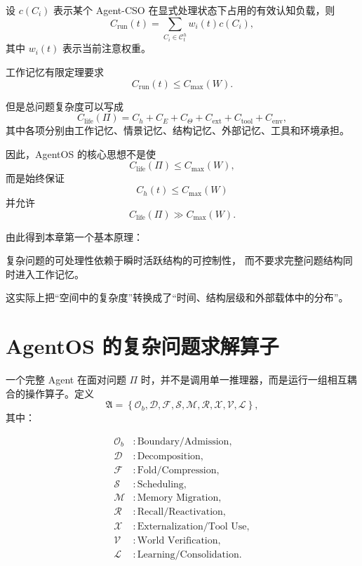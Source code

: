 设 $c(C_i)$ 表示某个 Agent-CSO 在显式处理状态下占用的有效认知负载，则
\begin{equation}
C_{\mathrm{run}}(t)
=
\sum_{C_i\in\mathcal C_t^{h}}
w_i(t)c(C_i),
\end{equation}
其中 $w_i(t)$ 表示当前注意权重。

工作记忆有限定理要求
\begin{equation}
C_{\mathrm{run}}(t)
\leq
C_{\max}(W).
\end{equation}

但是总问题复杂度可以写成
\begin{equation}
C_{\mathrm{life}}(\Pi)
=
C_h
+
C_E
+
C_\Theta
+
C_{\mathrm{ext}}
+
C_{\mathrm{tool}}
+
C_{\mathrm{env}},
\end{equation}
其中各项分别由工作记忆、情景记忆、结构记忆、外部记忆、工具和环境承担。

因此，AgentOS 的核心思想不是使
\begin{equation}
C_{\mathrm{life}}(\Pi)
\leq
C_{\max}(W),
\end{equation}
而是始终保证
\begin{equation}
\boxed{
C_h(t)
\leq
C_{\max}(W)
}
\end{equation}
并允许
\begin{equation}
C_{\mathrm{life}}(\Pi)
\gg
C_{\max}(W).
\end{equation}

由此得到本章第一个基本原理：

\begin{statementbox}
复杂问题的可处理性依赖于瞬时活跃结构的可控制性，
而不要求完整问题结构同时进入工作记忆。
\end{statementbox}

这实际上把“空间中的复杂度”转换成了“时间、结构层级和外部载体中的分布”。

\section{AgentOS 的复杂问题求解算子}

一个完整 Agent 在面对问题 $\Pi$ 时，并不是调用单一推理器，而是运行一组相互耦合的操作算子。定义
\begin{equation}
\mathfrak A
=
\left\{
\mathcal O_b,
\mathcal D,
\mathcal F,
\mathcal S,
\mathcal M,
\mathcal R,
\mathcal X,
\mathcal V,
\mathcal L
\right\},
\end{equation}
其中：

\begin{align}
\mathcal O_b &: \text{Boundary/Admission},\\
\mathcal D &: \text{Decomposition},\\
\mathcal F &: \text{Fold/Compression},\\
\mathcal S &: \text{Scheduling},\\
\mathcal M &: \text{Memory Migration},\\
\mathcal R &: \text{Recall/Reactivation},\\
\mathcal X &: \text{Externalization/Tool Use},\\
\mathcal V &: \text{World Verification},\\
\mathcal L &: \text{Learning/Consolidation}.
\end{align}

